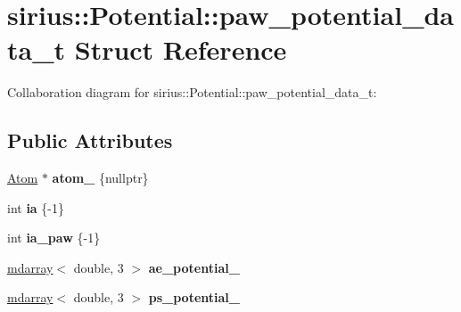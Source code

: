 \hypertarget{structsirius_1_1_potential_1_1paw__potential__data__t}{}\section{sirius\+:\+:Potential\+:\+:paw\+\_\+potential\+\_\+data\+\_\+t Struct Reference}
\label{structsirius_1_1_potential_1_1paw__potential__data__t}


Collaboration diagram for sirius\+:\+:Potential\+:\+:paw\+\_\+potential\+\_\+data\+\_\+t\+:
\subsection*{Public Attributes}
\begin{DoxyCompactItemize}
\item 
\hypertarget{structsirius_1_1_potential_1_1paw__potential__data__t_a435a5b1d9c54fe2b9f2da92f1b17e5ac}{}\hyperlink{classsirius_1_1_atom}{Atom} $\ast$ {\bfseries atom\+\_\+} \{nullptr\}\label{structsirius_1_1_potential_1_1paw__potential__data__t_a435a5b1d9c54fe2b9f2da92f1b17e5ac}

\item 
\hypertarget{structsirius_1_1_potential_1_1paw__potential__data__t_a32ef4e8586819588fc5377e8f738b690}{}int {\bfseries ia} \{-\/1\}\label{structsirius_1_1_potential_1_1paw__potential__data__t_a32ef4e8586819588fc5377e8f738b690}

\item 
\hypertarget{structsirius_1_1_potential_1_1paw__potential__data__t_a4a175be2daa050dd9cdf0c279a731410}{}int {\bfseries ia\+\_\+paw} \{-\/1\}\label{structsirius_1_1_potential_1_1paw__potential__data__t_a4a175be2daa050dd9cdf0c279a731410}

\item 
\hypertarget{structsirius_1_1_potential_1_1paw__potential__data__t_abf6a3f409640f8113765ce0aad61c603}{}\hyperlink{classsddk_1_1mdarray}{mdarray}$<$ double, 3 $>$ {\bfseries ae\+\_\+potential\+\_\+}\label{structsirius_1_1_potential_1_1paw__potential__data__t_abf6a3f409640f8113765ce0aad61c603}

\item 
\hypertarget{structsirius_1_1_potential_1_1paw__potential__data__t_a0e0190822c2ee5a5cd3e8ee39514aad2}{}\hyperlink{classsddk_1_1mdarray}{mdarray}$<$ double, 3 $>$ {\bfseries ps\+\_\+potential\+\_\+}\label{structsirius_1_1_potential_1_1paw__potential__data__t_a0e0190822c2ee5a5cd3e8ee39514aad2}


\end{DoxyCompactItemize}
